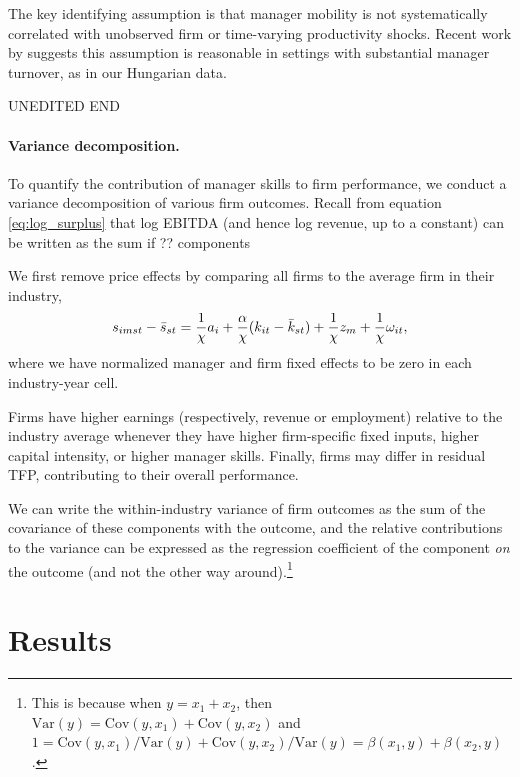 \documentclass[11pt,a4paper]{article}
\newcommand{\Var}{\text{Var}}
\newcommand{\Cov}{\text{Cov}}
\begin{document}
The key identifying assumption is that manager mobility is not systematically correlated with unobserved firm or time-varying productivity shocks. Recent work by \citet{metcalfe2023managers} suggests this assumption is reasonable in settings with substantial manager turnover, as in our Hungarian data.

UNEDITED END

\paragraph{Variance decomposition.} To quantify the contribution of manager skills to firm performance, we conduct a variance decomposition of various firm outcomes. Recall from equation \eqref{eq:log_surplus} that log EBITDA (and hence log revenue, up to a constant) can be written as the sum if ?? components

We first remove price effects by comparing all firms to the average firm in their industry,
\begin{equation}
s_{imst} - \Bar s_{st} = \frac1\chi a_i + \frac\alpha\chi (k_{it} - \Bar k_{st}) + \frac1\chi {z}_{m}+ \frac1\chi{\omega}_{it},
\end{equation}
where we have normalized manager and firm fixed effects to be zero in each industry-year cell.

Firms have higher earnings (respectively, revenue or employment) relative to the industry average whenever they have higher firm-specific fixed inputs, higher capital intensity, or higher manager skills. Finally, firms may differ in residual TFP, contributing to their overall performance.

We can write the within-industry variance of firm outcomes as the sum of the covariance of these components with the outcome, and the relative contributions to the variance can be expressed as the regression coefficient of the component \emph{on} the outcome (and not the other way around).\footnote{This is because when $y = x_1 + x_2$, then $\Var(y) = \Cov(y, x_1) + \Cov(y, x_2)$ and $1 = \Cov(y, x_1) / \Var(y) + \Cov(y, x_2) / \Var(y) = \beta(x_1, y) + \beta(x_2, y)$.}

\section{Results}
\end{document}

